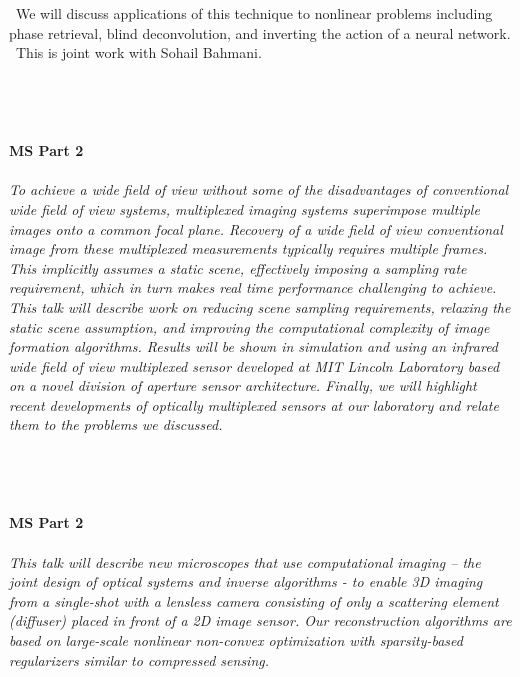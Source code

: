 \begin{multicols}{2}
{\
We will discuss applications of this technique to nonlinear problems including phase retrieval, blind deconvolution, and inverting the action of a neural network.
\
This is joint work with Sohail Bahmani.
}\\
\\ 
    \\
    \\\\
    \noindent\textbf{MS Part 2}\\
\\  
    \textit{To achieve a wide field of view without some of the disadvantages of conventional wide field of view systems, multiplexed imaging systems superimpose multiple images onto a common focal plane. Recovery of a wide field of view conventional image from these multiplexed measurements typically requires multiple frames. This implicitly assumes a static scene, effectively imposing a sampling rate requirement, which in turn makes real time performance challenging to achieve. This talk will describe work on reducing scene sampling requirements, relaxing the static scene assumption, and improving the computational complexity of image formation algorithms. Results will be shown in simulation and using an infrared wide field of view multiplexed sensor developed at MIT Lincoln Laboratory based on a novel division of aperture sensor architecture. Finally, we will highlight recent developments of optically multiplexed sensors at our laboratory and relate them to the problems we discussed.}\\
\\ 
    \myaut{Yaron Rachlin}\\
    \\\\
    \noindent\textbf{MS Part 2}\\
\\  
    \textit{This talk will describe new microscopes that use computational imaging – the joint design of optical systems and inverse algorithms - to enable 3D imaging from a single-shot with a lensless camera consisting of only a scattering element (diffuser) placed in front of a 2D image sensor. Our reconstruction algorithms are based on large-scale nonlinear non-convex optimization with sparsity-based regularizers similar to compressed sensing. }\\
\\ 
    \myaut{Laura Waller}\\

\end{multicols}
